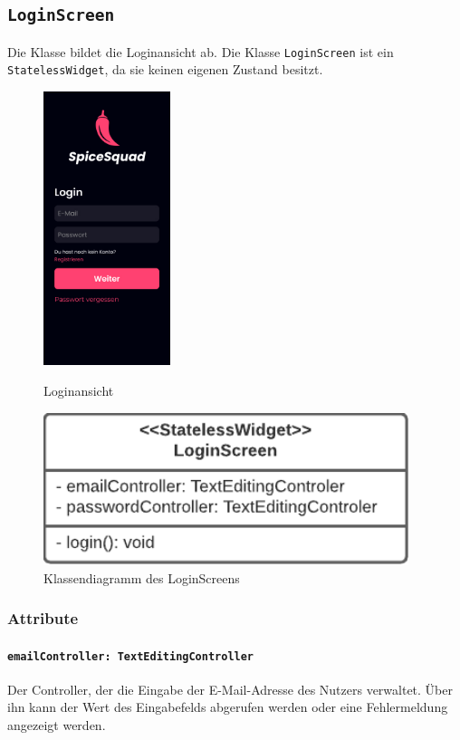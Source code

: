 \documentclass{entwurfsheft}
\begin{document}
\begin{sloppypar}
\subsection{\texttt{LoginScreen}}
\label{sec:loginScreen}
Die Klasse bildet die Loginansicht ab. Die Klasse \texttt{LoginScreen} ist ein \texttt{StatelessWidget}, da sie keinen eigenen Zustand besitzt.
\begin{figure}[htp]
    \begin{minipage}
        [t]{0.49\textwidth}
        \centering
        \includegraphics[height=80mm]{images/presentationLayer/uiElements/loginScreen.jpg}
        \caption{Loginansicht}
    \end{minipage}
    \begin{minipage}
        [t]{0.49\textwidth}
        \centering
        \includegraphics[width=0.95\textwidth]{images/presentationLayer/classDiagrams/loginScreen.pdf}
        \caption{Klassendiagramm des Login\-Screens}
    \end{minipage}
\end{figure}
\subsubsection*{Attribute}
\paragraph{\texttt{emailController: TextEditingController}}
Der Controller, der die Eingabe der E-Mail-Ad\-resse des Nutzers verwaltet. Über ihn kann der Wert des Eingabefelds abgerufen werden oder eine Fehlermeldung angezeigt werden.

\end{sloppypar}
\end{document}
